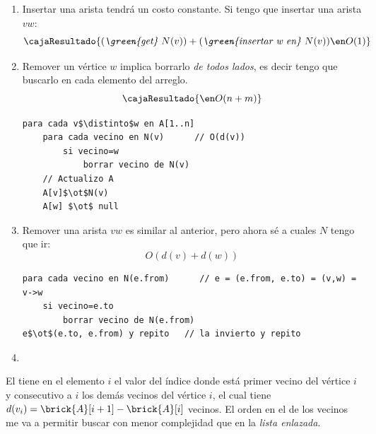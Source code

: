 \begin{enumerate}[label=$\text{\red{ED}}_\arabic*)$, itemsep=-2pt]
\begin{enumerate}[label=$\alph*)$]
          \item  Insertar una arista tendrá un costo constante. Si tengo que insertar una arista $vw$:
                $$
                  \cajaResultado{
                    (\textit{\green{get}} ~ N(v) ) + (\textit{\green{insertar w en}} ~ N(v)) \en O(1)
                  }
                $$

          \item Remover un vértice $w$ implica borrarlo \textit{de todos lados}, es decir tengo que buscarlo
                en cada elemento del arreglo.
                $$
                  \cajaResultado  {
                    \en O(n + m)
                  }
                $$
                \begin{tcolorbox}
                  \begin{lstlisting}
para cada v$\distinto$w en A[1..n]
    para cada vecino en N(v)      // O(d(v))
        si vecino=w 
            borrar vecino de N(v)
    // Actualizo A 
    A[v]$\ot$N(v)
    A[w] $\ot$ null\end{lstlisting}

                \end{tcolorbox}

          \item Remover una arista $vw$ es similar al anterior, pero ahora sé a cuales $N$ tengo que ir:
                $$
                  O(d(v) + d(w))
                $$
                \begin{tcolorbox}
                  \begin{lstlisting}
para cada vecino en N(e.from)      // e = (e.from, e.to) = (v,w) = v->w
    si vecino=e.to 
        borrar vecino de N(e.from)
e$\ot$(e.to, e.from) y repito   // la invierto y repito \end{lstlisting}
                \end{tcolorbox}

          \item \Hacer
        \end{enumerate}

        \bigskip

        El  tiene en el elemento $i$ el valor del índice donde está primer vecino del vértice $i$ y consecutivo a $i$ los demás vecinos
        del vértice $i$, el cual tiene $d(v_i) = \brick{A}[i+1] - \brick{A}[i]$ vecinos.
        El orden en el  de los vecinos me va a permitir buscar con menor complejidad que en la \textit{lista enlazada}.


\end{enumerate}
